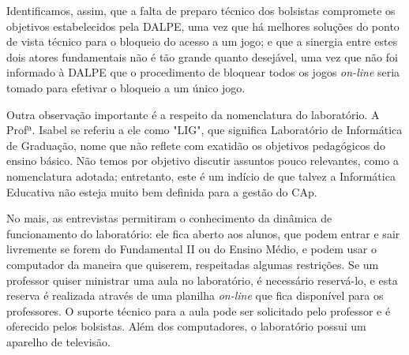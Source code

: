 Identificamos, assim, que a falta de preparo técnico dos bolsistas compromete os objetivos estabelecidos pela DALPE, uma vez que há melhores soluções do ponto de vista técnico para o bloqueio do acesso a um jogo; e que a sinergia entre estes dois atores fundamentais não é tão grande quanto desejável, uma vez que não foi informado à DALPE que o procedimento de bloquear todos os jogos \textit{on-line} seria tomado para efetivar o bloqueio a um único jogo.

Outra observação importante é a respeito da nomenclatura do laboratório. A Profª. Isabel se referiu a ele como "LIG", que significa Laboratório de Informática de Graduação, nome que não reflete com exatidão os objetivos pedagógicos do ensino básico. Não temos por objetivo discutir assuntos pouco relevantes, como a nomenclatura adotada; entretanto, este é um indício de que talvez a Informática Educativa não esteja muito bem definida para a gestão do CAp.

No mais, as entrevistas permitiram o conhecimento da dinâmica de funcionamento do laboratório: ele fica aberto aos alunos, que podem entrar e sair livremente se forem do Fundamental II ou do Ensino Médio, e podem usar o computador da maneira que quiserem, respeitadas algumas restrições. Se um professor quiser ministrar uma aula no laboratório, é necessário reservá-lo, e esta reserva é realizada através de uma planilha \textit{on-line} que fica disponível para os professores. O suporte técnico para a aula pode ser solicitado pelo professor e é oferecido pelos bolsistas. Além dos computadores, o laboratório possui um aparelho de televisão.
